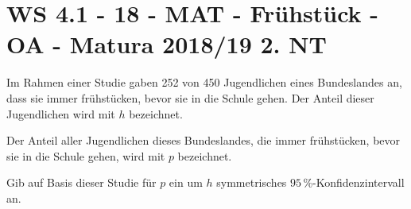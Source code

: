 \section{WS 4.1 - 18 - MAT - Frühstück - OA - Matura 2018/19 2. NT}

\begin{beispiel}[WS 4.1]{1}
Im Rahmen einer Studie gaben 252 von 450 Jugendlichen eines Bundeslandes an, dass sie immer frühstücken, bevor sie in die Schule gehen. Der Anteil dieser Jugendlichen wird mit $h$ bezeichnet.

Der Anteil aller Jugendlichen dieses Bundeslandes, die immer frühstücken, bevor sie in die Schule gehen, wird mit $p$ bezeichnet.

Gib auf Basis dieser Studie für $p$ ein um $h$ symmetrisches $95\,\%$-Konfidenzintervall an.

\end{beispiel}